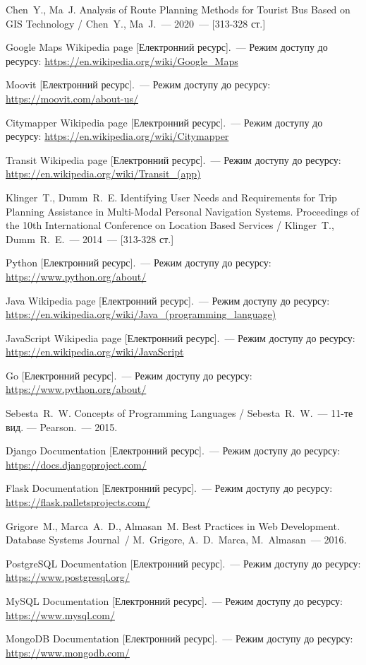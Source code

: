 \begin{thebibliography}
	 Chen~Y., Ma~J. Analysis of Route Planning Methods for Tourist Bus Based on GIS Technology / Chen~Y., Ma~J.~--- 2020~--- [313-328 ст.]
	

	 Google Maps Wikipedia page [Електронний ресурс].~--- Режим доступу до ресурсу:
	\url{https://en.wikipedia.org/wiki/Google_Maps}

	 Moovit [Електронний ресурс].~--- Режим доступу до ресурсу:
	\url{https://moovit.com/about-us/}

	 Citymapper Wikipedia page [Електронний ресурс].~--- Режим доступу до ресурсу:
	\url{https://en.wikipedia.org/wiki/Citymapper}


	 Transit Wikipedia page [Електронний ресурс].~--- Режим доступу до ресурсу:
	\url{https://en.wikipedia.org/wiki/Transit_(app)}
	


	 Klinger~T., Dumm~R.~E. Identifying User Needs and Requirements for Trip Planning Assistance in Multi-Modal Personal Navigation Systems. Proceedings of the 10th International Conference on Location Based Services / Klinger~T., Dumm~R.~E.~--- 2014~--- [313-328 ст.]



	 Python [Електронний ресурс].~--- Режим доступу до ресурсу:
	\url{https://www.python.org/about/}

	 Java Wikipedia page [Електронний ресурс].~--- Режим доступу до ресурсу:
	\url{https://en.wikipedia.org/wiki/Java_(programming_language)}

	 JavaScript Wikipedia page [Електронний ресурс].~--- Режим доступу до ресурсу:
	\url{https://en.wikipedia.org/wiki/JavaScript}

	 Go [Електронний ресурс].~--- Режим доступу до ресурсу:
	\url{https://www.python.org/about/}
	
	 Sebesta~R.~W.  Concepts of Programming Languages / Sebesta~R.~W.~--- 11-те вид. --- Pearson.~--- 2015.


	 Django Documentation [Електронний ресурс].~--- Режим доступу до ресурсу:
	\url{https://docs.djangoproject.com/}

	 Flask Documentation [Електронний ресурс].~--- Режим доступу до ресурсу:
	\url{https://flask.palletsprojects.com/}


	 Grigore~M., Marca~A.~D., Almasan~M.  Best Practices in Web Development. Database Systems Journal~/ M.~Grigore, A.~D.~Marca, M.~Almasan~--- 2016.

	 PostgreSQL Documentation [Електронний ресурс].~--- Режим доступу до ресурсу:
	\url{https://www.postgresql.org/}
	
	 MySQL Documentation [Електронний ресурс].~--- Режим доступу до ресурсу:
	\url{https://www.mysql.com/}

	 MongoDB Documentation [Електронний ресурс].~--- Режим доступу до ресурсу:
	\url{https://www.mongodb.com/}
\end{thebibliography}
